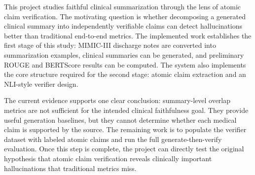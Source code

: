 \documentclass[11pt]{article}
\begin{document}
This project studies faithful clinical summarization through the lens of atomic claim verification. The motivating question is whether decomposing a generated clinical summary into independently verifiable claims can detect hallucinations better than traditional end-to-end metrics. The implemented work establishes the first stage of this study: MIMIC-III discharge notes are converted into summarization examples, clinical summaries can be generated, and preliminary ROUGE and BERTScore results can be computed. The system also implements the core structure required for the second stage: atomic claim extraction and an NLI-style verifier design.

The current evidence supports one clear conclusion: summary-level overlap metrics are not sufficient for the intended clinical faithfulness goal. They provide useful generation baselines, but they cannot determine whether each medical claim is supported by the source. The remaining work is to populate the verifier dataset with labeled atomic claims and run the full generate-then-verify evaluation. Once this step is complete, the project can directly test the original hypothesis that atomic claim verification reveals clinically important hallucinations that traditional metrics miss.



\end{document}
